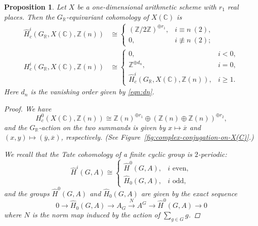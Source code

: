\documentclass[draft]{article}
\newcommand{\CC}{\mathbb{C}}
\newcommand{\RR}{\mathbb{R}}
\newcommand{\ZZ}{\mathbb{Z}}
\theoremstyle{myplain}
\newtheorem{proposition}[theorem]{Proposition}
\theoremstyle{mydefinition}
\begin{document}
\begin{proposition}
  Let $X$ be a one-dimensional arithmetic scheme with $r_1$ real places.
  Then the $G_\RR$-equivariant cohomology of $X(\CC)$ is
  \begin{align}
    \label{eqn:Tate-GR-cohomology-of-X(C)}
    \widehat{H}^i_c (G_\RR, X(\CC), \ZZ (n)) & \cong
                                              \begin{cases}
                                                (\ZZ/2\ZZ)^{\oplus r_1}, & i \equiv n ~ (2), \\
                                                0, & i \not\equiv n ~ (2);
                                              \end{cases} \\
    \label{eqn:usual-GR-cohomology-of-X(C)}
    H^i_c (G_\RR, X(\CC), \ZZ (n)) & \cong
                                    \begin{cases}
                                      0, & i < 0, \\
                                      \ZZ^{\oplus d_n}, & i = 0, \\
                                      \widehat{H}^i_c (G_\RR, X(\CC), \ZZ (n)), & i \ge 1.
                                    \end{cases}
  \end{align}
  Here $d_n$ is the vanishing order given by \eqref{eqn:dn}.

  \begin{proof}
    We have
    \[ H^0_c (X(\CC), \ZZ(n)) \cong
      \ZZ (n)^{\oplus r_1} \oplus (\ZZ (n) \oplus \ZZ (n))^{\oplus r_2}, \]
    and the $G_\RR$-action on the two summands is given by
    $x \mapsto \overline{x}$ and $(x,y) \mapsto (\overline{y}, \overline{x})$,
    respectively. (See Figure~\eqref{fig:complex-conjugation-on-X(C)}.)

    We recall that the Tate cohomology of a finite cyclic group is $2$-periodic:
    \[ \widehat{H}^i (G,A) \cong
      \begin{cases}
        \widehat{H}^0 (G,A), & i\text{ even}, \\
        \widehat{H}_0 (G,A), & i\text{ odd},
      \end{cases} \]
    and the groups $\widehat{H}^0 (G,A)$ and $\widehat{H}_0 (G,A)$ are given by
    the exact sequence
    \[ 0 \to \widehat{H}_0 (G,A) \to
      A_G \xrightarrow{N} A^G \to
      \widehat{H}^0 (G,A) \to 0 \]
    where $N$ is the norm map induced by the action of $\sum_{g\in G} g$.


\end{proof}
\end{proposition}
\end{document}
